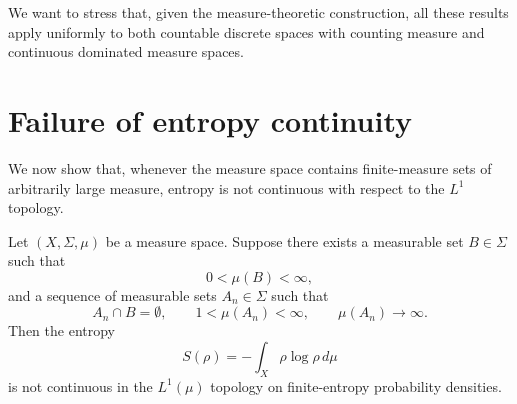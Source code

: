 \documentclass{techbrief}
\begin{document}
We want to stress that, given the measure-theoretic construction, all these results apply uniformly to both countable discrete spaces with counting measure and continuous dominated measure spaces.
	
\section{Failure of entropy continuity}

We now show that, whenever the measure space contains finite-measure sets of arbitrarily large measure, entropy is not continuous with respect to the $L^1$ topology.

\begin{thrm}
	Let $(X,\Sigma,\mu)$ be a measure space. Suppose there exists a measurable set $B\in\Sigma$ such that
	\begin{equation}
		0<\mu(B)<\infty,
	\end{equation}
	and a sequence of measurable sets $A_n\in\Sigma$ such that
	\begin{equation}
		A_n\cap B=\emptyset,\qquad
		1<\mu(A_n)<\infty,\qquad
		\mu(A_n)\to\infty.
	\end{equation}
	Then the entropy
	\begin{equation}
		S(\rho)=-\int_X \rho\log\rho\,d\mu
	\end{equation}
	is not continuous in the $L^1(\mu)$ topology on finite-entropy probability densities.
\end{thrm}
\end{document}
